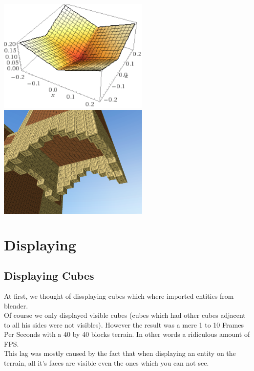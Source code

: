 \documentclass[article]{report}         %
\begin{document}
          \begin{center}
            \includegraphics[width=7.5cm]{images/Abs.png}
            \includegraphics[width=7.5cm]{images/DT/DarkBeard.png} %
          \end{center}
      \section{Displaying}
        \subsection{Displaying Cubes}
          At first, we thought of dissplaying cubes which where imported entities from blender. \\
          Of course we only displayed visible cubes (cubes which had other cubes adjacent to all his sides were not visibles). However the result was a mere 1 to 10 Frames Per Seconds with a 40 by 40 blocks terrain. In other words a ridiculous amount of FPS.\\

          This lag was mostly caused by the fact that when displaying an entity on the terrain, all it's faces are visible even the ones which you can not see.
\end{document}
